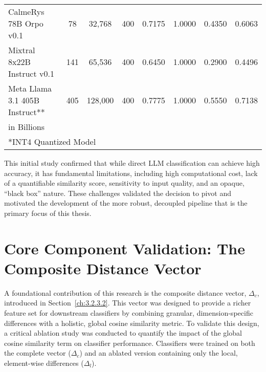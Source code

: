 \begin{table}[tb]
{\begin{tabular}{lccccccc}
            CalmeRys 78B Orpo v0.1          & 78                   & 32,768                          & 400              & 0.7175            & 1.0000 & 0.4350          & 0.6063          \\
            Mixtral 8x22B Instruct v0.1     & 141                  & 65,536                          & 400              & 0.6450            & 1.0000 & 0.2900          & 0.4496          \\
            Meta Llama 3.1 405B Instruct**  & 405                  & 128,000                         & 400              & 0.7775            & 1.0000 & 0.5550          & 0.7138          \\
            \bottomrule
            \multicolumn{8}{l}{\footnotesize *in Billions}                                                                                                                               \\
            \multicolumn{8}{l}{\footnotesize **INT4 Quantized Model}
        \end{tabular}
    }
\end{table}

This initial study confirmed that while direct LLM classification can achieve high accuracy, it has fundamental limitations, including high computational cost, lack of a quantifiable similarity score, sensitivity to input quality, and an opaque, ``black box'' nature. These challenges validated the decision to pivot and motivated the development of the more robust, decoupled pipeline that is the primary focus of this thesis.

\section{Core Component Validation: The Composite Distance Vector}\label{ch:4.3}
A foundational contribution of this research is the composite distance vector, \(\Delta_c\), introduced in Section~\ref{ch:3.2.3.2}. This vector was designed to provide a richer feature set for downstream classifiers by combining granular, dimension-specific differences with a holistic, global cosine similarity metric. To validate this design, a critical ablation study was conducted to quantify the impact of the global cosine similarity term on classifier performance. Classifiers were trained on both the complete vector (\(\Delta_c\)) and an ablated version containing only the local, element-wise differences (\(\Delta_l\)).

